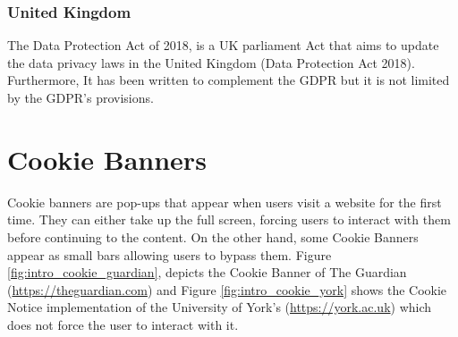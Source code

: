 \documentclass[../main.tex]{subfiles}
\begin{document}
\subsubsection{United Kingdom}
The Data Protection Act of 2018, is a UK parliament Act that aims to update the data privacy laws in the United Kingdom \cite{dpa_2018} (Data Protection Act 2018). Furthermore, It has been written to complement the GDPR but it is not limited by the GDPR’s provisions. 

\section{Cookie Banners}
Cookie banners are pop-ups that appear when users visit a website for the first time. They can either take up the full screen, forcing users to interact with them before continuing to the content. On the other hand, some Cookie Banners appear as small bars allowing users to bypass them. Figure \ref{fig:intro_cookie_guardian}, depicts the  Cookie Banner of The Guardian (\url{https://theguardian.com}) and Figure \ref{fig:intro_cookie_york} shows the Cookie Notice implementation of the University of York’s (\url{https://york.ac.uk}) which does not force the user to interact with it. 
\end{document}
